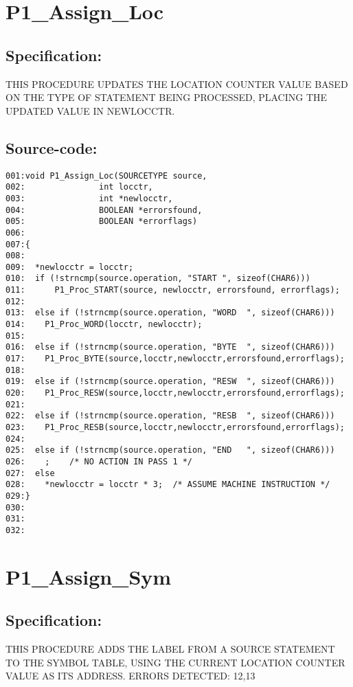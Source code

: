 \section{P1\_Assign\_Loc}
\subsection*{Specification:}
THIS PROCEDURE UPDATES THE LOCATION COUNTER VALUE BASED ON THE TYPE OF
STATEMENT BEING PROCESSED, PLACING THE UPDATED VALUE IN NEWLOCCTR.
\subsection*{Source-code:}
\begin{verbatim}
001:void P1_Assign_Loc(SOURCETYPE source,
002:               int locctr, 
003:               int *newlocctr,
004:               BOOLEAN *errorsfound,
005:               BOOLEAN *errorflags)
006:
007:{
008:  
009:  *newlocctr = locctr;
010:  if (!strncmp(source.operation, "START ", sizeof(CHAR6)))
011:      P1_Proc_START(source, newlocctr, errorsfound, errorflags);
012:
013:  else if (!strncmp(source.operation, "WORD  ", sizeof(CHAR6)))
014:    P1_Proc_WORD(locctr, newlocctr);
015:
016:  else if (!strncmp(source.operation, "BYTE  ", sizeof(CHAR6)))
017:    P1_Proc_BYTE(source,locctr,newlocctr,errorsfound,errorflags);
018:
019:  else if (!strncmp(source.operation, "RESW  ", sizeof(CHAR6)))
020:    P1_Proc_RESW(source,locctr,newlocctr,errorsfound,errorflags);
021:  
022:  else if (!strncmp(source.operation, "RESB  ", sizeof(CHAR6)))
023:    P1_Proc_RESB(source,locctr,newlocctr,errorsfound,errorflags);
024:  
025:  else if (!strncmp(source.operation, "END   ", sizeof(CHAR6)))
026:    ;    /* NO ACTION IN PASS 1 */
027:  else
028:    *newlocctr = locctr * 3;  /* ASSUME MACHINE INSTRUCTION */  
029:}
030:
031:
032:
\end{verbatim}
\section{P1\_Assign\_Sym}
\subsection*{Specification:}
THIS PROCEDURE ADDS THE LABEL FROM A SOURCE STATEMENT TO THE SYMBOL TABLE,
USING THE CURRENT LOCATION COUNTER VALUE AS ITS ADDRESS.  ERRORS DETECTED:
12,13
